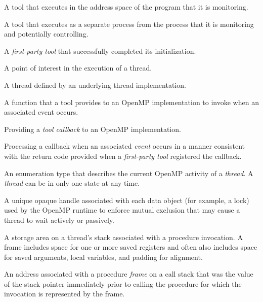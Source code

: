 \glossarydefstart
A tool that executes in the address space of the program that it is monitoring.
\glossarydefend

\glossarydefstart
A tool that executes as a separate process from the process that it is 
monitoring and potentially controlling.
\glossarydefend

\glossarydefstart
A \emph{first-party tool} that successfully completed its initialization.
\glossarydefend

\glossarydefstart
A point of interest in the execution of a thread.
\glossarydefend

\glossarydefstart
A thread defined by an underlying thread implementation.
\glossarydefend

\glossarydefstart
A function that a tool provides to an OpenMP implementation to 
invoke when an associated event occurs.
\glossarydefend

\glossarydefstart
Providing a \emph{tool callback} to an OpenMP implementation.
\glossarydefend

\glossarydefstart
Processing a callback when an associated \emph{event} occurs in a manner 
consistent with the return code provided when a \emph{first-party tool} 
registered the callback.
\glossarydefend

\glossarydefstart
An enumeration type that describes the current OpenMP activity  of a 
\emph{thread}. A \emph{thread} can be in only one state at any time.
\glossarydefend

\glossarydefstart
A unique opaque handle associated with each data object (for example, a lock) 
used by the OpenMP runtime to enforce mutual exclusion that may cause a thread 
to wait actively or passively.
\glossarydefend

\glossarydefstart
A storage area on a thread's stack associated with a procedure invocation. 
A frame includes space for one or more saved registers and often also 
includes space for saved arguments, local variables,
and padding for alignment.
\glossarydefend

\glossarydefstart
An address associated with a procedure \emph{frame} on a call stack that 
was the value of the stack pointer immediately prior to calling the procedure 
for which the invocation is represented by the frame.
\glossarydefend

